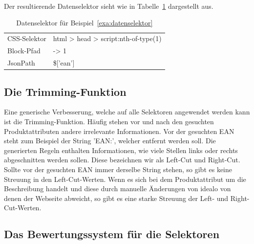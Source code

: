 Der resultierende Datenselektor sieht wie in Tabelle~\ref{tab:datenselektor} dargestellt aus.

\begin{table}[h]
    \centering
    \begin{tabular}{ l | l }
        CSS-Selektor &  html > head > script:nth-of-type(1)\\
        Block-Pfad   &  -> 1\\
        JsonPath     &  \$['ean']
    \end{tabular}
    \caption{Datenselektor für Beispiel~\ref{exa:datenselektor}}
    \label{tab:datenselektor}
\end{table}

\subsection{Die Trimming-Funktion}
\label{subsec:trimming-funktion}

Eine generische Verbesserung, welche auf alle Selektoren angewendet werden kann ist die Trimming-Funktion.
Häufig stehen vor und nach den gesuchten Produktattributen andere irrelevante Informationen.
Vor der gesuchten EAN steht zum Beispiel der String 'EAN:\textvisiblespace', welcher entfernt werden soll.
Die generierten Regeln enthalten Informationen, wie viele Stellen links oder rechts abgeschnitten werden sollen.
Diese bezeichnen wir als Left-Cut und Right-Cut.
Sollte vor der gesuchten EAN immer derselbe String stehen, so gibt es keine Streuung in den Left-Cut-Werten.
Wenn es sich bei dem Produktattribut um die Beschreibung handelt und diese durch manuelle Änderungen von idealo von
denen der Webseite abweicht, so gibt es eine starke Streuung der Left- und Right-Cut-Werten.

\subsection{Das Bewertungssystem für die Selektoren}
\label{subsec:bewertungssystem}

